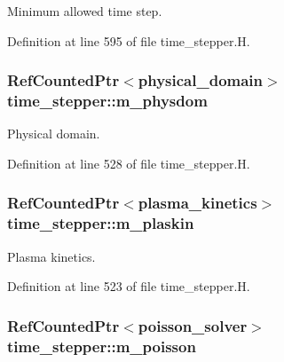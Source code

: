 Minimum allowed time step. 



Definition at line 595 of file time\+\_\+stepper.\+H.

\subsubsection[{\texorpdfstring{m\+\_\+physdom}{m_physdom}}]{\setlength{\rightskip}{0pt plus 5cm}Ref\+Counted\+Ptr$<${\bf physical\+\_\+domain}$>$ time\+\_\+stepper\+::m\+\_\+physdom\hspace{0.3cm}{\ttfamily [protected]}}\hypertarget{classtime__stepper_a055b9f785dc998fdc4d9a9d6b5896a0b}{}\label{classtime__stepper_a055b9f785dc998fdc4d9a9d6b5896a0b}


Physical domain. 



Definition at line 528 of file time\+\_\+stepper.\+H.

\subsubsection[{\texorpdfstring{m\+\_\+plaskin}{m_plaskin}}]{\setlength{\rightskip}{0pt plus 5cm}Ref\+Counted\+Ptr$<${\bf plasma\+\_\+kinetics}$>$ time\+\_\+stepper\+::m\+\_\+plaskin\hspace{0.3cm}{\ttfamily [protected]}}\hypertarget{classtime__stepper_aa6ac2a0f6cb3c0dcda12cc9cdb6c8cc3}{}\label{classtime__stepper_aa6ac2a0f6cb3c0dcda12cc9cdb6c8cc3}


Plasma kinetics. 



Definition at line 523 of file time\+\_\+stepper.\+H.

\subsubsection[{\texorpdfstring{m\+\_\+poisson}{m_poisson}}]{\setlength{\rightskip}{0pt plus 5cm}Ref\+Counted\+Ptr$<${\bf poisson\+\_\+solver}$>$ time\+\_\+stepper\+::m\+\_\+poisson\hspace{0.3cm}{\ttfamily [protected]}}\hypertarget{classtime__stepper_a86109da74846f40cabe5a940bf6ef360}{}\label{classtime__stepper_a86109da74846f40cabe5a940bf6ef360}


